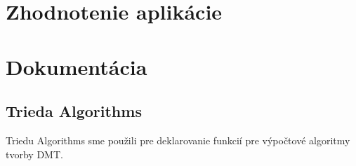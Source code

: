 \documentclass[12pt]{article}
\begin{document}
\clearpage 
\section{Zhodnotenie aplikácie}



\section{Dokumentácia}
\subsection{Trieda Algorithms}
Triedu Algorithms sme použili pre deklarovanie funkcií pre výpočtové algoritmy tvorby DMT.
\end{document}
